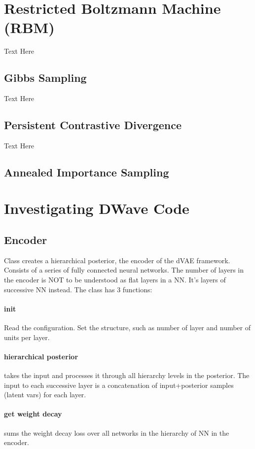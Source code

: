 
\section{Restricted Boltzmann Machine (RBM)}
\label{sec:rbm}
Text Here

\subsection{Gibbs Sampling}
\label{sec:gibbs}
Text Here

\subsection{Persistent Contrastive Divergence}
\label{sec:pcd}
Text Here

\subsection{Annealed Importance Sampling}
\label{sec:ais}


\section{Investigating DWave Code}
\subsection{Encoder}
Class creates a hierarchical posterior, the encoder of the dVAE framework.
Consists of a series of fully connected neural networks. The number of layers in
the encoder is NOT to be understood as flat layers in a NN. It's layers of
successive NN instead. The class has 3 functions: \paragraph{init} Read the
configuration. Set the structure, such as number of layer and number of units
per layer. \paragraph{hierarchical posterior} takes the input and processes it
through all hierarchy levels in the posterior. The input to each successive
layer is a concatenation of input+posterior samples (latent vars) for each
layer. \paragraph{get weight decay} sums the weight decay loss over all networks
in the hierarchy of NN in the encoder.

